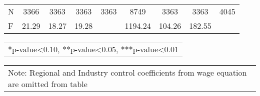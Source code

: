 \documentclass[12pt]{report}
\begin{document}
\begin{sidewaystable}
\begin{tabular}{lc|c|c|c|c|c|c|c}
\hline
N & 3366 & 3363 & 3363 & 3363 & 8749 & 3363 & 3363 & 4045\\
F & 21.29 & 18.27 & 19.28 & & 1194.24 & 104.26 & 182.55 & \\
\hline
\hline
\end{tabular}
\begin{tabular}{p{6.25in}}\footnotesize{
*p-value<0.10, **p-value<0.05, ***p-value<0.01}\\
\end{tabular}
\begin{tabular}{p{6.25in}}\footnotesize{
Note: Regional and Industry control coefficients from wage equation are omitted from table}\\
\end{tabular}
\end{sidewaystable}

\begin{comment}R-sq & 0.1620 & -0.0657 & -0.0686 & -0.2034 & 0.6473 & -0.0401 & -0.3203 & 0.0171\\
\end{comment}
\end{document}
